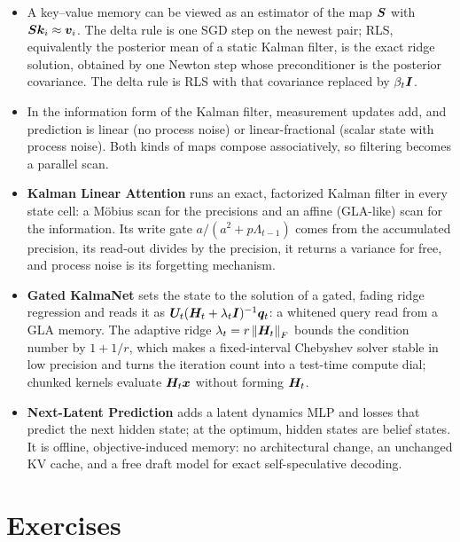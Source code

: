 \begin{summarybox}
\begin{itemize}
  \item A key--value memory can be viewed as an estimator of the map $\bm{S}$ with $\bm{S}\bm{k}_i\approx\bm{v}_i$.
  The delta rule is one SGD step on the newest pair; RLS, equivalently the posterior mean of a static
  Kalman filter, is the exact ridge solution, obtained by one Newton step whose preconditioner is the
  posterior covariance. The delta rule is RLS with that covariance replaced by $\beta_t\bm{I}$.
  \item In the information form of the Kalman filter, measurement updates add, and prediction is
  linear (no process noise) or linear-fractional (scalar state with process noise). Both kinds of maps
  compose associatively, so filtering becomes a parallel scan.
  \item \textbf{Kalman Linear Attention} runs an exact, factorized Kalman filter in every state cell:
  a M\"obius scan for the precisions and an affine (GLA-like) scan for the information. Its write
  gate $a/(a^2+p\Lambda_{t-1})$ comes from the accumulated precision, its read-out divides by the
  precision, it returns a variance for free, and process noise is its forgetting mechanism.
  \item \textbf{Gated KalmaNet} sets the state to the solution of a gated, fading ridge regression and
  reads it as $\bm{U}_t(\bm{H}_t+\lambda_t\bm{I})^{-1}\bm{q}_t$: a whitened query read from a GLA memory. The
  adaptive ridge $\lambda_t=r\left\lVert \bm{H}_t\right\rVert_F$ bounds the condition number by $1+1/r$, which makes a
  fixed-interval Chebyshev solver stable in low precision and turns the iteration count into a
  test-time compute dial; chunked kernels evaluate $\bm{H}_t\bm{x}$ without forming $\bm{H}_t$.
  \item \textbf{Next-Latent Prediction} adds a latent dynamics MLP and losses that predict the next
  hidden state; at the optimum, hidden states are belief states. It is offline, objective-induced
  memory: no architectural change, an unchanged KV cache, and a free draft model for exact
  self-speculative decoding.
\end{itemize}
\end{summarybox}

\section*{Exercises}

